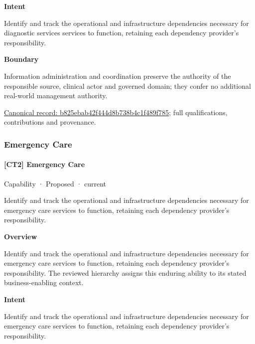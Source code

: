 \textbf{Intent}



Identify and track the operational and infrastructure dependencies necessary for diagnostic services services to function, retaining each dependency provider's responsibility.



\textbf{Boundary}



Information administration and coordination preserve the authority of the responsible source, clinical actor and governed domain; they confer no additional real-world management authority.


{\footnotesize \href{../../../../continuum/strategy/capability/b825ebab42f444d8b738b4c1f489f785.md}{Canonical record: b825ebab42f444d8b738b4c1f489f785}; full qualifications, contributions and provenance.}\par
\subsubsection{Emergency Care}

\paragraph{[CT2] Emergency Care}

\label{element:aa088f0647ad4b78966fe28fa80af674}
{\small Capability · Proposed · current}\par

Identify and track the operational and infrastructure dependencies necessary for emergency care services to function, retaining each dependency provider's responsibility.



\textbf{Overview}



Identify and track the operational and infrastructure dependencies necessary for emergency care services to function, retaining each dependency provider's responsibility. The reviewed hierarchy assigns this enduring ability to its stated business-enabling context.



\textbf{Intent}



Identify and track the operational and infrastructure dependencies necessary for emergency care services to function, retaining each dependency provider's responsibility.



